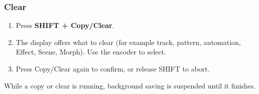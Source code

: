 \subsubsection{Clear}\label{clear}

\begin{enumerate}
\def\labelenumi{\arabic{enumi}.}
\tightlist
\item
  Press \textbf{SHIFT + Copy/Clear}.
\item
  The display offers what to clear (for example track, pattern,
  automation, Effect, Scene, Morph). Use the encoder to select.
\item
  Press Copy/Clear again to confirm, or release SHIFT to abort.
\end{enumerate}

While a copy or clear is running, background saving is suspended until
it finishes.

